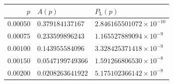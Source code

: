 \begin{tabular}{@{}r|l|l@{}}
\toprule
$p$ & $A(p)$ & $P_{\mathrm L}(p)$ \\
\midrule
$0.00050$ & $0.379184137167$ & $2.846165501072\times10^{-10}$ \\
$0.00075$ & $0.233599896243$ & $1.165527889094\times10^{-9}$ \\
$0.00100$ & $0.143955584096$ & $3.328425371418\times10^{-9}$ \\
$0.00150$ & $0.0547199749366$ & $1.591266806530\times10^{-8}$ \\
$0.00200$ & $0.0208263641922$ & $5.175102366142\times10^{-8}$ \\
\bottomrule
\end{tabular}

